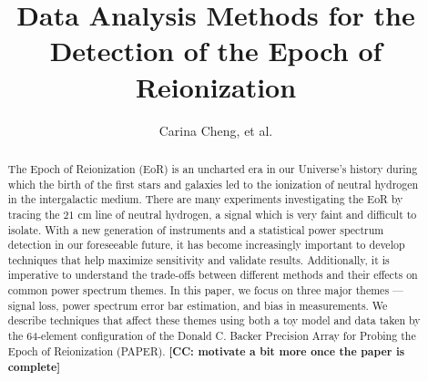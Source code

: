 \documentclass[preprint2,numberedappendix,tighten]{aastex6}  %
\newcommand{\cc}[1]{{\color{purple} \textbf{[CC: #1]}}}
\begin{document}
\title{Data Analysis Methods for the Detection of the Epoch of Reionization}

\author{
Carina Cheng,
et al.
}


	






\begin{abstract}
The Epoch of Reionization (EoR) is an uncharted era in our Universe's history during which the birth of the first stars and galaxies led to the ionization of neutral hydrogen in the intergalactic medium. There are many experiments investigating the EoR by tracing the $21$ cm line of neutral hydrogen, a signal which is very faint and difficult to isolate. With a new generation of instruments and a statistical power spectrum detection in our foreseeable future, it has become increasingly important to develop techniques that help maximize sensitivity and validate results. Additionally, it is imperative to understand the trade-offs between different methods and their effects on common power spectrum themes. In this paper, we focus on three major themes --- signal loss, power spectrum error bar estimation, and bias in measurements. We describe techniques that affect these themes using both a toy model and data taken by the 64-element configuration of the Donald C. Backer Precision Array for Probing the Epoch of Reionization (PAPER). \cc{motivate a bit more once the paper is complete}
\end{abstract}
\end{document}
